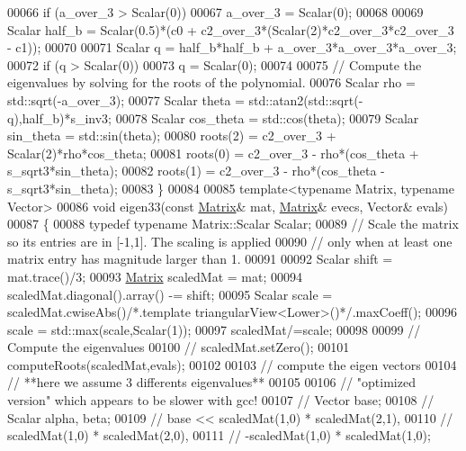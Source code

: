 \begin{DoxyCode}
00066   \textcolor{keywordflow}{if} (a\_over\_3 > Scalar(0))
00067     a\_over\_3 = Scalar(0);
00068 
00069   Scalar half\_b = Scalar(0.5)*(c0 + c2\_over\_3*(Scalar(2)*c2\_over\_3*c2\_over\_3 - c1));
00070 
00071   Scalar q = half\_b*half\_b + a\_over\_3*a\_over\_3*a\_over\_3;
00072   \textcolor{keywordflow}{if} (q > Scalar(0))
00073     q = Scalar(0);
00074 
00075   \textcolor{comment}{// Compute the eigenvalues by solving for the roots of the polynomial.}
00076   Scalar rho = std::sqrt(-a\_over\_3);
00077   Scalar theta = std::atan2(std::sqrt(-q),half\_b)*s\_inv3;
00078   Scalar cos\_theta = std::cos(theta);
00079   Scalar sin\_theta = std::sin(theta);
00080   roots(2) = c2\_over\_3 + Scalar(2)*rho*cos\_theta;
00081   roots(0) = c2\_over\_3 - rho*(cos\_theta + s\_sqrt3*sin\_theta);
00082   roots(1) = c2\_over\_3 - rho*(cos\_theta - s\_sqrt3*sin\_theta);
00083 \}
00084 
00085 \textcolor{keyword}{template}<\textcolor{keyword}{typename} Matrix, \textcolor{keyword}{typename} Vector>
00086 \textcolor{keywordtype}{void} eigen33(\textcolor{keyword}{const} \hyperlink{group___core___module_class_eigen_1_1_matrix}{Matrix}& mat, \hyperlink{group___core___module_class_eigen_1_1_matrix}{Matrix}& evecs, Vector& evals)
00087 \{
00088   \textcolor{keyword}{typedef} \textcolor{keyword}{typename} Matrix::Scalar Scalar;
00089   \textcolor{comment}{// Scale the matrix so its entries are in [-1,1].  The scaling is applied}
00090   \textcolor{comment}{// only when at least one matrix entry has magnitude larger than 1.}
00091 
00092   Scalar shift = mat.trace()/3;
00093   \hyperlink{group___core___module_class_eigen_1_1_matrix}{Matrix} scaledMat = mat;
00094   scaledMat.diagonal().array() -= shift;
00095   Scalar scale = scaledMat.cwiseAbs()\textcolor{comment}{/*.template triangularView<Lower>()*/}.maxCoeff();
00096   scale = std::max(scale,Scalar(1));
00097   scaledMat/=scale;
00098 
00099   \textcolor{comment}{// Compute the eigenvalues}
00100 \textcolor{comment}{//   scaledMat.setZero();}
00101   computeRoots(scaledMat,evals);
00102 
00103   \textcolor{comment}{// compute the eigen vectors}
00104   \textcolor{comment}{// **here we assume 3 differents eigenvalues**}
00105 
00106   \textcolor{comment}{// "optimized version" which appears to be slower with gcc!}
00107 \textcolor{comment}{//     Vector base;}
00108 \textcolor{comment}{//     Scalar alpha, beta;}
00109 \textcolor{comment}{//     base <<   scaledMat(1,0) * scaledMat(2,1),}
00110 \textcolor{comment}{//               scaledMat(1,0) * scaledMat(2,0),}
00111 \textcolor{comment}{//              -scaledMat(1,0) * scaledMat(1,0);}

\end{DoxyCode}
